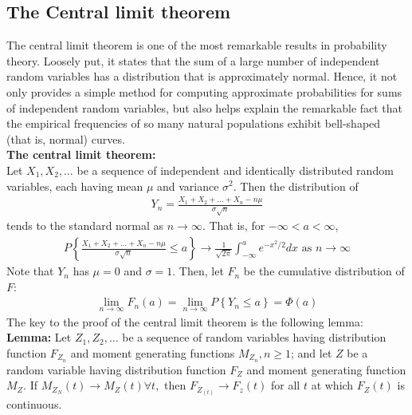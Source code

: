 \documentclass[a4paper]{article}
\begin{document}
\subsection{The Central limit theorem} %
\label{sub:The Central limit theorem}
The central limit theorem is one of the most remarkable results in probability theory. Loosely put, it states that the sum of a large number of independent random variables has a distribution that is approximately normal. Hence, it not only provides a simple method for computing approximate probabilities for sums of independent random variables, but also helps explain the remarkable fact that the empirical frequencies of so many natural populations exhibit bell-shaped (that is, normal) curves. \\
{\bf The central limit theorem:} \\
Let $X_1,X_2,\dots$ be a sequence of independent and identically distributed random variables, each having mean $\mu$ and variance $\sigma^2$. Then the distribution of
\begin{align}
 Y_n =  \frac{X_1+X_2+\dots+X_n -n\mu}{\sigma\sqrt{n}}
\end{align}
tends to the standard normal as $n\rightarrow\infty$. That is, for $-\infty<a<\infty$,
\begin{align}
  P\left\{  \frac{X_1+X_2+\dots+X_n -n\mu}{\sigma\sqrt{n}} \leq a \right\} 
  \rightarrow \frac{1}{\sqrt{2 \pi}} \int_{-\infty}^{a}e^{-x^2/2} dx \text{ as } n\rightarrow \infty
\end{align}
Note that $Y_n$ has $\mu=0$ and $\sigma=1$. Then, let $F_n$ be the cumulative distribution of $F$:
\begin{align}
  \lim_{n\rightarrow\infty}F_n(a)=\lim_{n\rightarrow\infty}P\left\{ Y_n\leq a\right\} = \Phi(a)
\end{align}
The key to the proof of the central limit theorem is the following lemma:
{\bf Lemma:} Let $Z_1,Z_2,\dots$ be a sequence of random variables having distribution function $F_{Z_{n}}$ and moment generating functions $M_{Z_n},n\geq1$; and let $Z$ be a random variable having distribution function $F_Z$ and moment generating function $M_Z$. If $M_{Z_N}(t)\rightarrow M_Z(t) \forall t, $ then $F_{Z_(t)}\rightarrow F_z(t)$ for all $t$ at which $F_Z(t)$ is continuous. 
\end{document}
